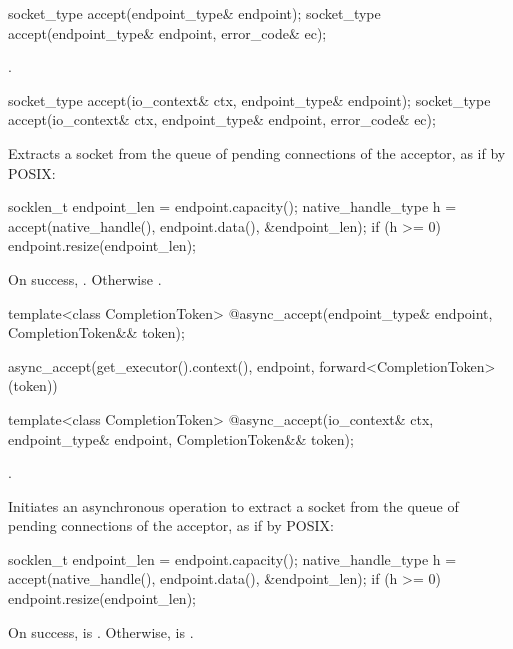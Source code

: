 \begin{itemdecl}
socket_type accept(endpoint_type& endpoint);
socket_type accept(endpoint_type& endpoint, error_code& ec);
\end{itemdecl}

\begin{itemdescr}
\pnum
\returns {}.
\end{itemdescr}

\begin{itemdecl}
socket_type accept(io_context& ctx, endpoint_type& endpoint);
socket_type accept(io_context& ctx, endpoint_type& endpoint,
                   error_code& ec);
\end{itemdecl}

\begin{itemdescr}
\pnum
\effects Extracts a socket from the queue of pending connections of the acceptor, as if by POSIX:
\begin{codeblock}
socklen_t endpoint_len = endpoint.capacity();
native_handle_type h = accept(native_handle(),
                              endpoint.data(),
                              &endpoint_len);
if (h >= 0)
  endpoint.resize(endpoint_len);
\end{codeblock}


\pnum
\returns On success, . Otherwise .
\end{itemdescr}

\begin{itemdecl}
template<class CompletionToken>
  @\DEDUCED@ async_accept(endpoint_type& endpoint,
                       CompletionToken&& token);
\end{itemdecl}

\begin{itemdescr}
\pnum
\returns
\begin{codeblock}
async_accept(get_executor().context(), endpoint, forward<CompletionToken>(token))
\end{codeblock}
\end{itemdescr}

\begin{itemdecl}
template<class CompletionToken>
  @\DEDUCED@ async_accept(io_context& ctx, endpoint_type& endpoint,
                       CompletionToken&& token);
\end{itemdecl}

\begin{itemdescr}
\pnum
\completionsig {}.

\pnum
\effects Initiates an asynchronous operation to extract a socket from the queue of pending connections of the acceptor, as if by POSIX:
\begin{codeblock}
socklen_t endpoint_len = endpoint.capacity();
native_handle_type h = accept(native_handle(),
                              endpoint.data(),
                              &endpoint_len);
if (h >= 0)
  endpoint.resize(endpoint_len);
\end{codeblock}
On success,  is . Otherwise,   is  .
\end{itemdescr}

